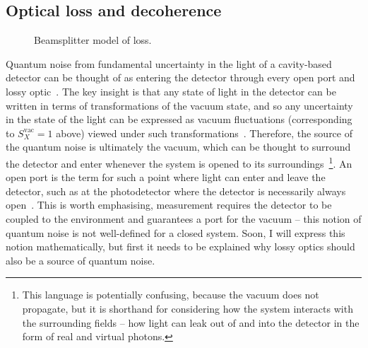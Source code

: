 \subsection{Optical loss and decoherence}
\label{sec:optical_loss_background}

\begin{figure}
	\centering
	\caption{Beamsplitter model of loss.}
	\label{fig:beamsplitter_loss}
\end{figure}

Quantum noise from fundamental uncertainty in the light of a cavity-based detector can be thought of as entering the detector through every open port and lossy optic~\cite{}. %
The key insight is that any state of light in the detector can be written in terms of transformations of the vacuum state, and so any uncertainty in the state of the light can be expressed as vacuum fluctuations (corresponding to $S_X^\text{vac}=1$ above) viewed under such transformations~\cite{}. Therefore, the source of the quantum noise is ultimately the vacuum, which can be thought to surround the detector and enter whenever the system is opened to its surroundings~\footnote{This language is potentially confusing, because the vacuum does not propagate, but it is shorthand for considering how the system interacts with the surrounding fields -- how light can leak out of and into the detector in the form of real and virtual photons.}. An open port is the term for such a point where light can enter and leave the detector, such as at the photodetector where the detector is necessarily always open~\cite{}. This is worth emphasising, measurement requires the detector to be coupled to the environment and guarantees a port for the vacuum -- this notion of quantum noise is not well-defined for a closed system. Soon, I will express this notion mathematically, but first it needs to be explained why lossy optics should also be a source of quantum noise.


